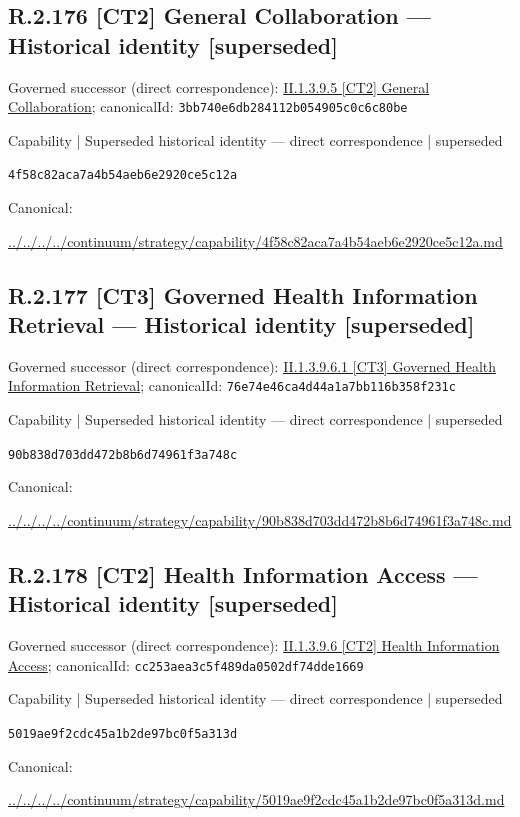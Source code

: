 \documentclass[10pt,a4paper]{article}
\begin{document}
\subsection*{R.2.176 [CT2] General Collaboration — Historical identity [superseded]}
Governed successor (direct correspondence): \hyperref[element-3bb740e6db284112b054905c0c6c80be]{II.1.3.9.5 [CT2] General Collaboration}; canonicalId: \texttt{3bb740e6db284112b054905c0c6c80be}\par
\label{element-4f58c82aca7a4b54aeb6e2920ce5c12a}
{\small Capability | Superseded historical identity — direct correspondence | superseded}\par
\texttt{4f58c82aca7a4b54aeb6e2920ce5c12a}\par
Canonical: \par
{\footnotesize\url{../../../../continuum/strategy/capability/4f58c82aca7a4b54aeb6e2920ce5c12a.md}}\par
\subsection*{R.2.177 [CT3] Governed Health Information Retrieval — Historical identity [superseded]}
Governed successor (direct correspondence): \hyperref[element-76e74e46ca4d44a1a7bb116b358f231c]{II.1.3.9.6.1 [CT3] Governed Health Information Retrieval}; canonicalId: \texttt{76e74e46ca4d44a1a7bb116b358f231c}\par
\label{element-90b838d703dd472b8b6d74961f3a748c}
{\small Capability | Superseded historical identity — direct correspondence | superseded}\par
\texttt{90b838d703dd472b8b6d74961f3a748c}\par
Canonical: \par
{\footnotesize\url{../../../../continuum/strategy/capability/90b838d703dd472b8b6d74961f3a748c.md}}\par
\subsection*{R.2.178 [CT2] Health Information Access — Historical identity [superseded]}
Governed successor (direct correspondence): \hyperref[element-cc253aea3c5f489da0502df74dde1669]{II.1.3.9.6 [CT2] Health Information Access}; canonicalId: \texttt{cc253aea3c5f489da0502df74dde1669}\par
\label{element-5019ae9f2cdc45a1b2de97bc0f5a313d}
{\small Capability | Superseded historical identity — direct correspondence | superseded}\par
\texttt{5019ae9f2cdc45a1b2de97bc0f5a313d}\par
Canonical: \par
{\footnotesize\url{../../../../continuum/strategy/capability/5019ae9f2cdc45a1b2de97bc0f5a313d.md}}\par
\end{document}
